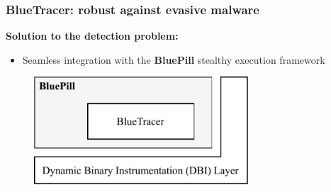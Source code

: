 \documentclass[compress]{beamer}
\begin{document}
\begin{frame}
    \frametitle{BlueTracer: robust against evasive malware}

\textcolor{sapienza}{\textbf{Solution to the detection problem:}}
\begin{itemize}
\item Seamless integration with the \textbf{BluePill} stealthy execution framework
\end{itemize}



\bigskip
\bigskip
	    \begin{figure}
    	\vspace{-0.8cm}
        \includegraphics[width=8cm]{image/BluePill.pdf}
    \end{figure}


\end{frame}
\end{document}
